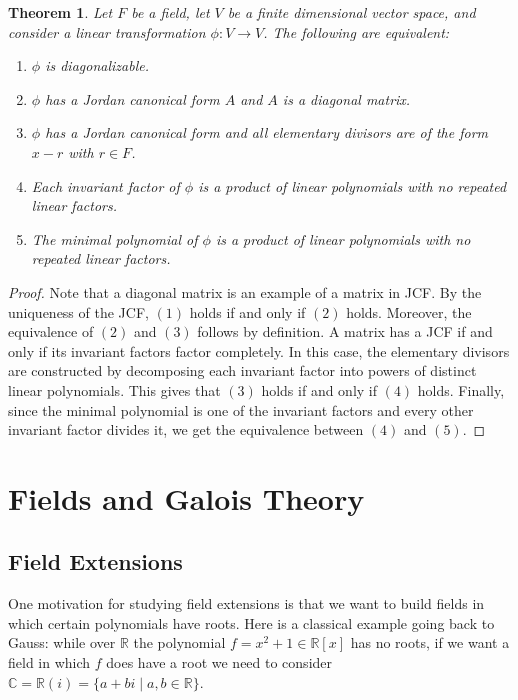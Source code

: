 \documentclass[12pt]{report}
\newtheorem{theorem}{Theorem}[chapter]
\numberwithin{equation}{section}
\numberwithin{theorem}{chapter}
\theoremstyle{definition}
\newtheorem*{basic properties}{Basic Properties}
\newtheorem*{Important Remark}{Important Remark}
\newcommand{\C}{\mathbb{C}}
\begin{document}
\begin{theorem}\label{diagonalization}
Let $F$ be a field, let $V$ be a finite dimensional vector space, and consider a linear transformation $\phi: V \to V$. The following are equivalent: 
\begin{enumerate}[label=(\arabic*)]
\item $\phi$ is diagonalizable.
\item $\phi$ has a Jordan canonical form $A$ and $A$ is a diagonal matrix. 
\item $\phi$ has a Jordan canonical form and all  elementary divisors are of the form $x - r$ with $r \in F$. 
\item Each invariant factor of $\phi$ is a product of linear polynomials with no repeated linear factors. 
\item The minimal polynomial of $\phi$ is a product of linear polynomials with no repeated linear factors.
\end{enumerate}
\end{theorem}


\begin{proof}
Note that a diagonal matrix is an example of a matrix in JCF. By the uniqueness of the JCF, $(1)$ holds if and only if $(2)$ holds.
Moreover, the equivalence of $(2)$ and $(3)$ follows by definition.
A matrix has a JCF if and only if its invariant factors factor completely. In this case, the elementary divisors are constructed by decomposing each invariant factor into powers of distinct linear polynomials. This gives that $(3)$ holds if and only if $(4)$ holds.
Finally, since the minimal polynomial is one of the invariant factors and every other invariant factor divides it, we get the equivalence between $(4)$ and $(5)$.
\end{proof}





\part{Fields and Galois Theory}




	




\chapter{Field Extensions}

One motivation for studying field extensions is that we want to build fields in which certain polynomials have roots. 
Here is a classical example going back to Gauss: while over $\mathbb{R}$ the polynomial $f = x^2+1\in \mathbb{R}[x]$ has no roots, if we want a field in which $f$ does have a root we need to consider $\C=\mathbb{R}(i)=\{a+bi\mid a,b\in \mathbb{R}\}$. 
\end{document}
